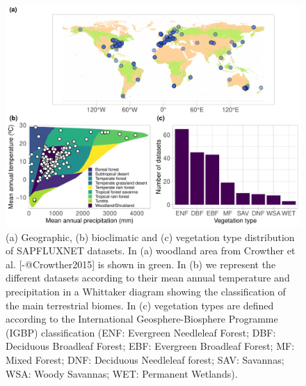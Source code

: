 \documentclass[11pt,twoside]{reedthesis}
\begin{document}
\setlength{\abovecaptionskip}{0pt}
\begin{figure}[H]

{\centering \includegraphics[width=1\linewidth]{figure/CH3/Figure2} 

}

\caption[Geographic, bioclimatic and vegetation type distribution of SAPFLUXNET datasets.]{(a) Geographic, (b) bioclimatic and (c) vegetation type distribution of SAPFLUXNET datasets. In (a) woodland area from Crowther et al. [-@Crowther2015] is shown in green. In (b) we represent the different datasets according to their mean annual temperature and precipitation in a Whittaker diagram showing the classification of the main terrestrial biomes. In (c) vegetation types are defined according to the International Geosphere-Biosphere Programme (IGBP) classification (ENF: Evergreen Needleleaf Forest; DBF: Deciduous Broadleaf Forest; EBF: Evergreen Broadleaf Forest; MF: Mixed Forest; DNF: Deciduous Needleleaf forest; SAV: Savannas; WSA: Woody Savannas; WET: Permanent Wetlands).}\label{fig:Ch2plot2}
\end{figure}
\setlength{\abovecaptionskip}{0pt}
\end{document}
